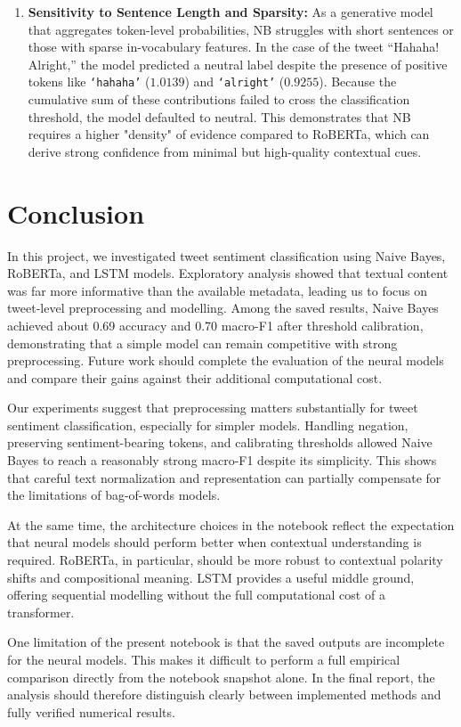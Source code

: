 \documentclass[11pt]{article}
\begin{document}
\begin{enumerate}
    \item \textbf{Sensitivity to Sentence Length and Sparsity:} 
    As a generative model that aggregates token-level probabilities, NB struggles with short sentences or those with sparse in-vocabulary features. In the case of the tweet ``Hahaha! Alright,'' the model predicted a neutral label despite the presence of positive tokens like \texttt{`hahaha'} ($1.0139$) and \texttt{`alright'} ($0.9255$). Because the cumulative sum of these contributions failed to cross the classification threshold, the model defaulted to neutral. This demonstrates that NB requires a higher "density" of evidence compared to RoBERTa, which can derive strong confidence from minimal but high-quality contextual cues.
\end{enumerate}
\section{Conclusion}

In this project, we investigated tweet sentiment classification using Naive Bayes, RoBERTa, and LSTM models. Exploratory analysis showed that textual content was far more informative than the available metadata, leading us to focus on tweet-level preprocessing and modelling. Among the saved results, Naive Bayes achieved about 0.69 accuracy and 0.70 macro-F1 after threshold calibration, demonstrating that a simple model can remain competitive with strong preprocessing. Future work should complete the evaluation of the neural models and compare their gains against their additional computational cost.

Our experiments suggest that preprocessing matters substantially for tweet sentiment classification, especially for simpler models. Handling negation, preserving sentiment-bearing tokens, and calibrating thresholds allowed Naive Bayes to reach a reasonably strong macro-F1 despite its simplicity. This shows that careful text normalization and representation can partially compensate for the limitations of bag-of-words models.

At the same time, the architecture choices in the notebook reflect the expectation that neural models should perform better when contextual understanding is required. RoBERTa, in particular, should be more robust to contextual polarity shifts and compositional meaning. LSTM provides a useful middle ground, offering sequential modelling without the full computational cost of a transformer.

One limitation of the present notebook is that the saved outputs are incomplete for the neural models. This makes it difficult to perform a full empirical comparison directly from the notebook snapshot alone. In the final report, the analysis should therefore distinguish clearly between implemented methods and fully verified numerical results.
\end{document}
